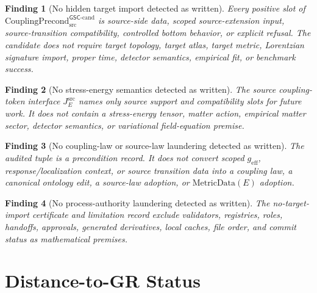 \documentclass[11pt]{article}
\newcommand{\geff}{g_{\mathrm{eff}}}
\newcommand{\CouplingPrecond}{\mathrm{CouplingPrecond}^{\mathsf{GSC}\mbox{-}\mathrm{cand}}_{\mathrm{src}}}
\newtheorem{finding}{Finding}
\begin{document}
\begin{finding}[No hidden target import detected as written]
Every positive slot of \(\CouplingPrecond\) is source-side data, scoped
source-extension input, source-transition compatibility, controlled bottom
behavior, or explicit refusal. The candidate does not require target topology,
target atlas, target metric, Lorentzian signature import, proper time,
detector semantics, empirical fit, or benchmark success.
\end{finding}

\begin{finding}[No stress-energy semantics detected as written]
The source coupling-token interface \(J^{\mathrm{src}}_E\) names only source
support and compatibility slots for future work. It does not contain a
stress-energy tensor, matter action, empirical matter sector, detector
semantics, or variational field-equation premise.
\end{finding}

\begin{finding}[No coupling-law or source-law laundering detected as written]
The audited tuple is a precondition record. It does not convert scoped
\(\geff\), response/localization context, or source transition data into a
coupling law, a canonical ontology edit, a source-law adoption, or
\(\mathrm{MetricData}(E)\) adoption.
\end{finding}

\begin{finding}[No process-authority laundering detected as written]
The no-target-import certificate and limitation record exclude validators,
registries, roles, handoffs, approvals, generated derivatives, local caches,
file order, and commit status as mathematical premises.
\end{finding}

\section{Distance-to-GR Status}
\end{document}
